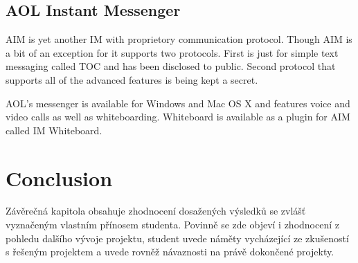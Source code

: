 \section*{AOL Instant Messenger}
AIM is yet another IM with proprietory communication protocol. Though AIM is a bit of an exception for it supports two protocols. First is just for simple text messaging called TOC and has been disclosed to public. Second protocol that supports all of the advanced features is being kept a secret.

AOL's messenger is available for Windows and Mac OS X and features voice and video calls as well as whiteboarding. Whiteboard is available as a plugin for AIM called IM Whiteboard. 




\chapter{Conclusion}
Závěrečná kapitola obsahuje zhodnocení dosažených výsledků se zvlášť vyznačeným vlastním přínosem studenta. Povinně se zde objeví i zhodnocení z pohledu dalšího vývoje projektu, student uvede náměty vycházející ze zkušeností s řešeným projektem a uvede rovněž návaznosti na právě dokončené projekty.

